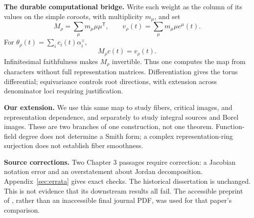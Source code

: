 \textbf{The durable computational bridge.} Write each weight as the column of its values on the simple coroots, with multiplicity $m_\mu$, and set
\[
M_\rho=\sum_\mu m_\mu\mu\mu^{\mathsf T},\qquad
v_\rho(t)=\sum_\mu m_\mu\mu e^\mu(t).
\]
For $\theta_\rho(t)=\sum_i c_i(t)\alpha_i^\vee$,
\begin{equation}\label{eq:weights}M_\rho c(t)=v_\rho(t).\end{equation}
Infinitesimal faithfulness makes $M_\rho$ invertible. Thus one computes the map from characters without full representation matrices. Differentiation gives the torus differential; equivariance controls root directions, with extension across denominator loci requiring justification.

\textbf{Our extension.} We use this same map to study fibers, critical images, and representation dependence, and separately to study integral sources and Borel images. These are two branches of one construction, not one theorem. Function-field degree does not determine a Smith form; a complex representation-ring surjection does not establish fiber smoothness.

\textbf{Source corrections.} Two Chapter 3 passages require correction: a Jacobian notation error and an overstatement about Jordan decomposition. Appendix~\ref{sec:errata} gives exact checks. The historical dissertation is unchanged. This is not evidence that its downstream results all fail. The accessible preprint of \cite{Rogers}, rather than an inaccessible final journal PDF, was used for that paper's comparison.
